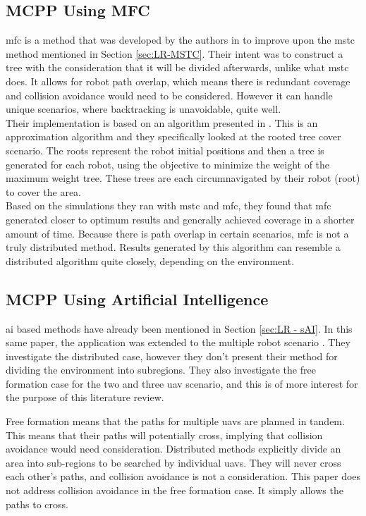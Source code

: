 \subsection{MCPP Using MFC}
\ac{mfc} is a method that was developed by the authors in \cite{Zheng2005} to improve upon the \ac{mstc} method mentioned in Section \ref{sec:LR-MSTC}. Their intent was to construct a tree with the consideration that it will be divided afterwards, unlike what \ac{mstc} does. It allows for robot path overlap, which means there is redundant coverage and collision avoidance would need to be considered. However it can handle unique scenarios, where backtracking is unavoidable, quite well.\\ 
Their implementation is based on an algorithm presented in \cite{Even2003}. This is an approximation algorithm and they specifically looked at the rooted tree cover scenario. The roots represent the robot initial positions and then a tree is generated for each robot, using the objective to minimize the weight of the maximum weight tree. These trees are each circumnavigated by their robot (root) to cover the area.\\
Based on the simulations they ran with \ac{mstc} and \ac{mfc}, they found that \ac{mfc} generated closer to optimum results and generally achieved coverage in a shorter amount of time.	Because there is path overlap in certain scenarios, \ac{mfc} is not a truly distributed method. Results generated by this algorithm can resemble a distributed algorithm quite closely, depending on the environment.
\subsection{MCPP Using Artificial Intelligence}
\label{sec:LR-mAI}
\acl{ai} based methods have already been mentioned in Section \ref{sec:LR - sAI}. In this same paper, the application was extended to the multiple robot scenario \cite{Juan2018}. They investigate the distributed case, however they don't present their method for dividing the environment into subregions. They also investigate the free formation case for the two and three \ac{uav} scenario, and this is of more interest for the purpose of this literature review.

Free formation means that the paths for multiple \acp{uav} are planned in tandem. This means that their paths will potentially cross, implying that collision avoidance would need consideration. Distributed methods explicitly divide an area into sub-regions to be searched by individual \acp{uav}. They will never cross each other's paths, and collision avoidance is not a consideration. This paper does not address collision avoidance in the free formation case. It simply allows the paths to cross.

